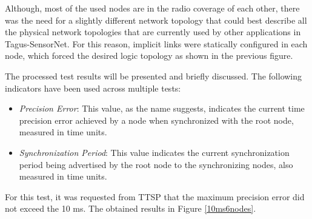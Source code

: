 \documentclass[11pt,a4]{article}
\begin{document}
\begin{multicols}{2}
Although, most of the used nodes are in the radio coverage of each other, there was the need for a slightly different network topology that could best describe all the physical network topologies that are currently used by other applications in Tagus-SensorNet. For this reason, implicit links were statically configured in each node, which forced the desired logic topology as shown in the previous figure.

The processed test results will be presented and briefly discussed. The following indicators have been used across multiple tests:
\begin{itemize}
\item \textit{Precision Error}:  This value, as the name suggests, indicates the current time precision error achieved by a node when synchronized with the root node, measured in time units.
\item \textit{Synchronization Period}: This value indicates the current synchronization period being advertised by the root node to the synchronizing nodes, also measured in time units.
\end{itemize}

 For this test, it was requested from TTSP that the maximum precision error did not exceed the 10 ms. The obtained results in Figure \ref{10ms6nodes}.


\end{multicols}
\end{document}
